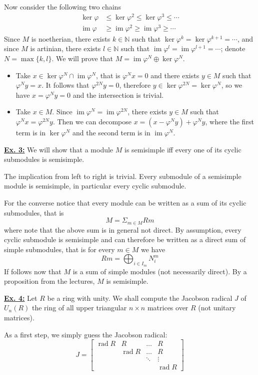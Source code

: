 \documentclass[a4paper, 12pt]{article}
\DeclareMathOperator{\im}{im}
\DeclareMathOperator{\rad}{rad}
\newcommand{\N}{\mathbb{N}}
\begin{document}
Now consider the following two chains
\begin{align*}
\ker\varphi &\leq \ker\varphi^2 \leq \ker\varphi^3 \leq \cdots \\
\im\varphi &\geq \im\varphi^2 \geq \im\varphi^3 \geq \cdots
\end{align*}
Since $M$ is noetherian, there exists $k \in \N$ such that $\ker\varphi^k = \ker\varphi^{k+1}=\cdots$, and since $M$ is artinian, there exists $l \in \N$ such that $\im\varphi^l = \im\varphi^{l+1} = \cdots$; denote $N = \max\lbrace k, l \rbrace$. We will prove that $M = \im\varphi^N \oplus \ker\varphi^N$.
\begin{itemize}
	\item Take $x \in \ker\varphi^N \cap \im\varphi^N$, that is $\varphi^Nx = 0$ and there exists $y \in M$ such that $\varphi^Ny = x$. It follows that $\varphi^{2N}y = 0$, therefore $y \in \ker\varphi^{2N} = \ker\varphi^N$, so we have $x = \varphi^Ny = 0$ and the intersection is trivial.
	\item Take $x \in M$. Since $\im\varphi^N = \im\varphi^{2N}$, there exists $y \in M$ such that $\varphi^Nx = \varphi^{2N}y$. Then we can decompose $x = (x - \varphi^Ny) + \varphi^Ny$, where the first term is in $\ker\varphi^N$ and the second term is in $\im\varphi^N$.
\end{itemize}

\underline{\textbf{Ex. 3:}}
We will show that a module $M$ is semisimple iff every one of its cyclic submodules is semisimple.

The implication from left to right is trivial. Every submodule of a semisimple module is semisimple, in particular every cyclic submodule.

For the converse notice that every module can be written as a sum of its cyclic submodules, that is
\[
M = \Sigma_{m \in M}Rm
\]
where note that the above sum is in general not direct. By assumption, every cyclic submodule is semisimple and can therefore be written as a direct sum of simple submodules, that is for every $m \in M$ we have
\[
Rm = \bigoplus_{i \in I_m} N_i^m
\]
If follows now that $M$ is a sum of simple modules (not necessarily direct). By a proposition from the lectures, $M$ is semisimple.
\newline

\underline{\textbf{Ex. 4:}}
Let $R$ be a ring with unity. We shall compute the Jacobson radical $J$ of $U_n(R)$ the ring of all upper triangular $n \times n$ matrices over $R$ (not unitary matrices).

As a first step, we simply guess the Jacobson radical:
\[
J = \begin{bmatrix}
\rad R & R  & \dots & R \\
 & \rad R  & \dots & R \\
  & & \ddots & \vdots \\
  & & & \rad R
\end{bmatrix}
\]
\end{document}
